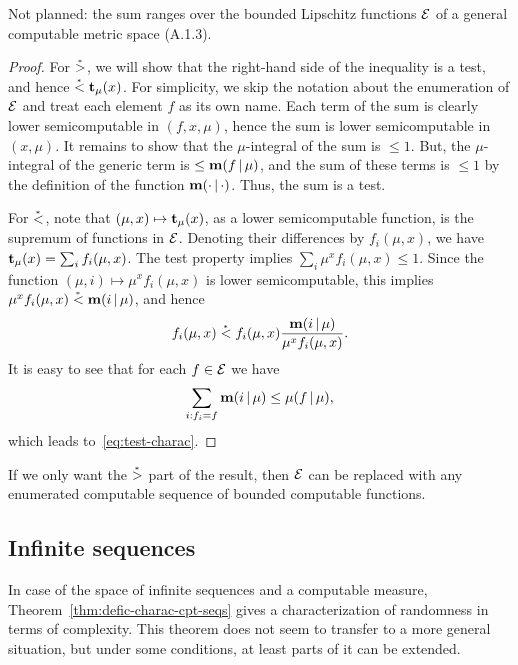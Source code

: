 \begin{formalization}
Not planned: the sum ranges over the bounded Lipschitz functions $\mathcal{E}$ of a general computable
metric space (A.1.3).
\end{formalization}
 \begin{proof}
  \notready
For \( \stackrel{{}_*}{>} \),
we will show that the right-hand side of the inequality is a test, and
hence \( \stackrel{{}_*}{<} \mathbf{t}_{\mu}(x) \).
For simplicity, we skip the notation about the enumeration of \( \mathcal{E} \) and
treat each element \( f \) as its own name.
Each term of the sum is clearly lower semicomputable in
\( (f, x, \mu) \), hence the sum is lower semicomputable in \( (x, \mu) \).
It remains to show that the \( \mu \)-integral of the sum is \( \le 1 \).
But, the \( \mu \)-integral of the generic term is \( \le \mathbf{m}(f \,\vert\, \mu) \), and
the sum of these terms is \( \le 1 \) by the definition of the function
\( \mathbf{m}(\cdot \,\vert\, \cdot) \).
Thus, the sum is a test.

For \( \stackrel{{}_*}{<} \), note that \( (\mu,x) \mapsto \mathbf{t}_{\mu}(x) \), 
as a lower semicomputable function, is the supremum of functions in \( \mathcal{E} \).
Denoting their differences by \( f_{i}(\mu,x) \),
we have \( \mathbf{t}_{\mu}(x) = \sum_{i} f_{i}(\mu,x) \).
The test property implies \( \sum_{i} \mu^{x} f_{i}(\mu,x) \le 1 \).
Since the function \( (\mu,i) \mapsto \mu^{x} f_{i}(\mu,x) \) is lower
semicomputable, this implies \( \mu^{x} f_{i}(\mu,x) \stackrel{{}_*}{<} \mathbf{m}(i \,\vert\, \mu) \), and
hence 
 \[
 f_{i}(\mu,x) \stackrel{{}_*}{<} f_{i}(\mu,x) \frac{\mathbf{m}(i \,\vert\, \mu)}{\mu^{x} f_{i}(\mu,x)}.
 \]
It is easy to see that for each \( f\in\mathcal{E} \) we have
 \[
   \sum_{i : f_{i} = f} \mathbf{m}(i \,\vert\, \mu) \le \mu(f \,\vert\, \mu),
 \]
which leads to~\eqref{eq:test-charac}.
 \end{proof}

 \begin{remark}\label{rem:test-charac-lb}
If we only want the \( \stackrel{{}_*}{>} \) part of the result, then \( \mathcal{E} \) can be
replaced with any enumerated computable sequence of bounded computable
functions.
 \end{remark}


  \subsection{Infinite sequences}

In case of the space of infinite sequences and a computable measure,
Theorem~\ref{thm:defic-charac-cpt-seqs} gives a characterization of
randomness in terms of complexity.
This theorem does not seem to transfer to a more general situation, but
under some conditions, at least parts of it can be extended.

